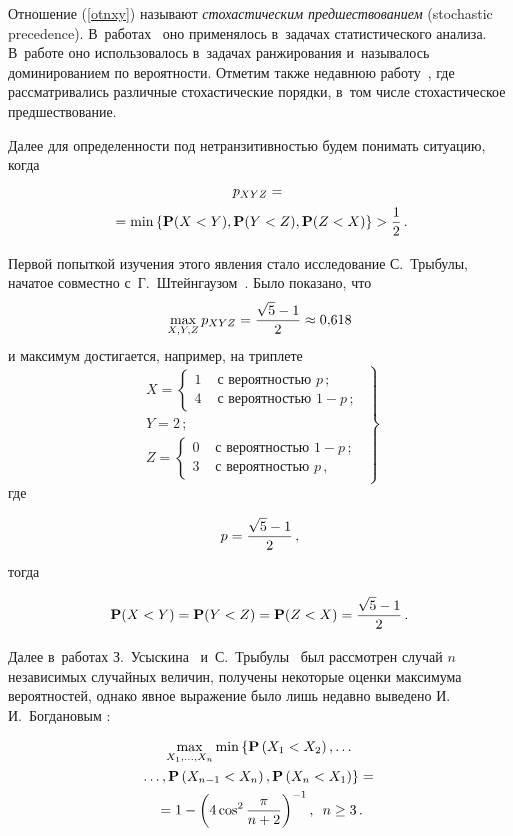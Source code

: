\begin{multicols}{2}
Отношение (\ref{otnxy}) называют 
\textit{стохастическим предшествованием} (stochastic pre\-ce\-den\-ce).
В~работах~\cite{Arc, Bols} оно применялось в~задачах статистического анализа. 
В~работе \cite{Shah} оно
использовалось в~задачах ранжирования и~называлось доминированием по вероятности. 
Отметим также недавнюю работу~\cite{Lep}, где рассматривались различные стохастические порядки, в~том числе
стохастическое предшествование.

Далее для определенности под не\-тран\-зи\-тив\-ностью будем понимать ситуацию, когда
\begin{multline*}
p_{XYZ}={}\\
{}=\min\left\{\mathbf{P}(X<Y),\mathbf{P}(Y<Z),\mathbf{P}(Z<X)\right\}>\displaystyle\frac{\displaystyle 1\mathstrut}{\displaystyle 2\mathstrut}\,.
\end{multline*}

Первой попыткой изучения этого явления стало исследование С.~Тры\-бу\-лы, 
начатое совместно с~Г.~Штейнгаузом~\cite{TrybS, Tryb}. Было показано, что
$$
\max\limits_{X,Y,Z}p_{XYZ}=\displaystyle\frac{\displaystyle \sqrt{5}-1\mathstrut}{\displaystyle 2\mathstrut}\approx 0{,}618
$$
и максимум достигается, например, на триплете
\begin{equation}
\label{tripl0}
\left.
\begin{array}{l}
X=\left\{\begin{array}{ll}
1 & \mbox{ с~вероятностью } p\,;\\[6pt]
4 & \mbox{ с~вероятностью } 1-p\,;
\end{array}\right.\\[12pt]
Y=2\,;\\[6pt]
Z=\left\{\begin{array}{ll}
0 & \mbox{ с~вероятностью } 1-p\,;\\[6pt]
3 & \mbox{ с~вероятностью } p\,,
\end{array}\right.
\end{array}
\right\}
\end{equation}
где

\noindent
$$
p=\displaystyle\frac{\displaystyle \sqrt{5}-1\mathstrut}{\displaystyle 2\mathstrut}\,,
$$
тогда

\noindent
$$
\mathbf{P}(X<Y)=\mathbf{P}(Y<Z)=\mathbf{P}(Z<X)=\displaystyle\frac{\displaystyle \sqrt{5}-1\mathstrut}{\displaystyle 2\mathstrut}\,.
$$

Далее в~работах З.~Усыскина~\cite{Usys} и~С.~Тры\-булы~\cite{Tryb2}
 был рассмотрен случай $n$ независимых случайных величин, получены некоторые оценки максимума вероятностей, однако явное выражение было
лишь недавно выведено И.\,И.~Богдановым \cite{Bogd}:

\noindent
\begin{multline*}
\max\limits_{X_1,\dots, X_n}\min\left\{{\bf P}\left(X_1<X_2\right),\ldots\right.\\
\left.\ldots,\mathbf{P}
\left(X_{n-1}<X_n\right),\mathbf{P}\left(X_n<X_1\right)\right\}={}\\ 
{}=1-\left(4\cos^2\displaystyle\frac{\displaystyle \pi\mathstrut}{\displaystyle n+2\mathstrut}\right)^{-1},\enskip n\ge 3\,.
\end{multline*}


\end{multicols}
